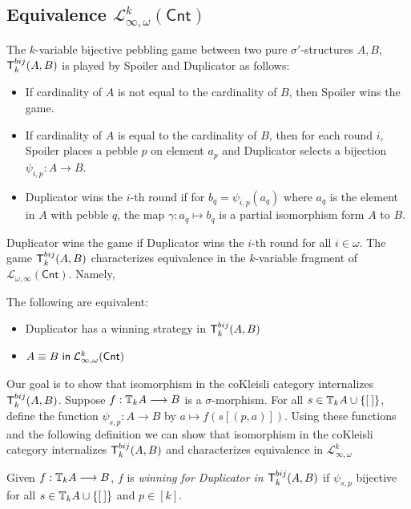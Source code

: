 \subsection{Equivalence $\mathcal{L}^{k}_{\infty,\omega}(\mathsf{Cnt})$}
The $k$-variable bijective pebbling game between two pure $\sigma'$-structures $A,B$, ${\mathsf{T}^{bij}_{k}(A,B)}$ is played by Spoiler and Duplicator as follows:
\begin{itemize}
\item If cardinality of $A$ is not equal to the cardinality of $B$, then Spoiler wins the game.
\item If cardinality of $A$ is equal to the cardinality of $B$, then for each round $i$, Spoiler places a pebble $p$ on element $a_{p}$ and Duplicator selects a bijection $\psi_{i,p}:A \longrightarrow B$. 
\item Duplicator wins the $i$-th round if for $b_{q} = \psi_{i,p}(a_{q})$ where $a_{q}$ is the element in $A$ with pebble $q$, the map $\gamma:a_{q} \mapsto b_{q}$ is a partial isomorphism form $A$ to $B$. 
\end{itemize}
Duplicator wins the game if Duplicator wins the $i$-th round for all $i \in \omega$. The game ${\mathsf{T}^{bij}_{k}(A,B)}$ characterizes equivalence in the $k$-variable fragment of $\mathcal{L}_{\omega,\infty}(\mathsf{Cnt})$. Namely,
\begin{prop}
The following are equivalent:
\begin{itemize}
\item Duplicator has a winning strategy in ${\mathsf{T}^{bij}_{k}(A,B)}$
\item ${A \equiv B \ \mathsf{in}\: \mathcal{L}^{k}_{\infty,\omega}(\mathsf{Cnt})}$
\end{itemize}
\label{prop:bijToSyntaxP}
\end{prop}
Our goal is to show that isomorphism in the coKleisli category internalizes ${\mathsf{T}^{bij}_{k}(A,B)}$. Suppose $f:{\mathbb{T}_{k}A} \longrightarrow B$ is a $\sigma$-morphism. For all $s \in {\mathbb{T}_{k}A} \cup \{{[\:]}\}$, define the function $\psi_{s,p}:A \longrightarrow B$ by $a \mapsto f(s[(p,a)])$. Using these functions and the following definition we can show that isomorphism in the coKleisli category internalizes ${\mathsf{T}^{bij}_{k}(A,B)}$ and characterizes equivalence in $\mathcal{L}^{k}_{\infty,\omega}$   
\begin{defn}
Given $f:{\mathbb{T}_{k}A} \longrightarrow B$, $f$ is \textit{winning for Duplicator in ${\mathsf{T}^{bij}_{k}(A,B)}$} if $\psi_{s,p}$ bijective for all $s \in {\mathbb{T}_{k}A} \cup \{{[\:]}\}$ and $p \in [k]$.  
\end{defn}
